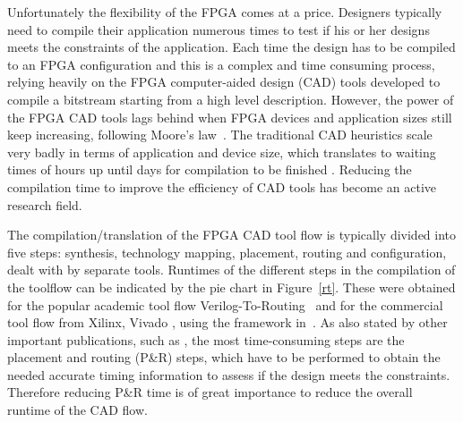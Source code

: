 \documentclass[a4paper,oneside,12pt]{article}
\begin{document}
Unfortunately the flexibility of the FPGA comes at a price. Designers typically need to compile their application numerous times to test if his or her designs meets the constraints of the application. Each time the design has to be compiled to an FPGA configuration and this is a complex and time consuming process, relying heavily on the FPGA computer-aided design (CAD) tools developed to compile a bitstream starting from a high level description.
However, the power of the FPGA CAD tools lags behind when FPGA devices and application sizes still keep increasing, following Moore's law~\cite{shannon2015technology}. The traditional CAD heuristics scale very badly in terms of application and device size, which translates to waiting times of hours up until days for compilation to be finished \cite{murray2015timing}.
Reducing the compilation time to improve the efficiency of CAD tools has become an active research field.

The compilation/translation of the FPGA CAD tool flow is typically divided into five steps: synthesis, technology mapping, placement, routing and configuration, dealt with by separate tools.  %
Runtimes of the different steps in the compilation of the toolflow can be indicated by the pie chart in Figure~\ref{rt}. These were obtained for the popular academic tool flow Verilog-To-Routing~\cite{luu2014vtr} and for the commercial tool flow from Xilinx, Vivado \cite{feist2012vivado}, using the framework in~\cite{vansteenkiste2015analyzing}. As also stated by other important publications, such as \cite{murray2015timing}, the most time-consuming steps are the placement and routing (P\&R) steps, which have to be performed to obtain the needed accurate timing information to assess if the design meets the constraints.
Therefore reducing P\&R time is of great importance to reduce the overall runtime of the CAD flow.

\end{document}
